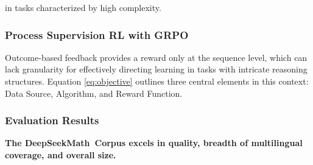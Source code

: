 in tasks characterized by high complexity. \subsubsection{Process Supervision RL with GRPO} 
Outcome-based feedback provides a reward only at the sequence level, which can lack granularity for effectively directing learning in tasks with intricate reasoning structures. Equation \ref{eq:objective} outlines three central elements in this context: Data Source, Algorithm, and Reward Function. \subsubsection{Evaluation Results}

\textbf{The DeepSeekMath~Corpus excels in quality, breadth of multilingual coverage, and overall size.}

